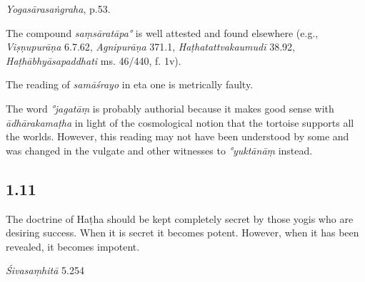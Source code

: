 \begin{ekdosis}
\begin{testimonia}[hp01_010]
\emph{Yogasārasaṅgraha}, p.53.

\begin{versinnote}
\end{versinnote}

\end{testimonia}

\begin{philcomm}[hp01_010] 
The compound \emph{saṃsāratāpa°} is well attested and found elsewhere (e.g., \emph{Viṣṇupurāṇa} 6.7.62, \emph{Agnipurāṇa} 371.1, \emph{Haṭhatattvakaumudī} 38.92, \emph{Haṭhābhyāsapaddhati} ms. 46/440, f. 1v). 

The reading of \emph{samāśrayo} in eta one is metrically faulty. 

The word \emph{°jagatāṃ} is probably authorial because it makes good sense with  \emph{ādhārakamaṭha} in light of the cosmological notion that the tortoise supports all the worlds. However, this reading may not have been understood by some and was changed in the vulgate and other witnesses to \emph{°yuktānāṃ} instead.      
\end{philcomm}

\subsection*{1.11}
\begin{translation}[hp01_011]
The doctrine of Haṭha should be kept completely secret by those yogis who are desiring success. When it is secret it becomes potent. However, when it has been revealed, it becomes impotent.
\end{translation}

\begin{sources}[hp01_011]
\emph{Śivasaṃhitā} 5.254

\begin{versinnote}
\tl{\var{haṭhavidyā ... icchatā ] \emph{om.} III–XII, XIV}\\!}
\end{versinnote}

\end{sources}


\end{ekdosis}
